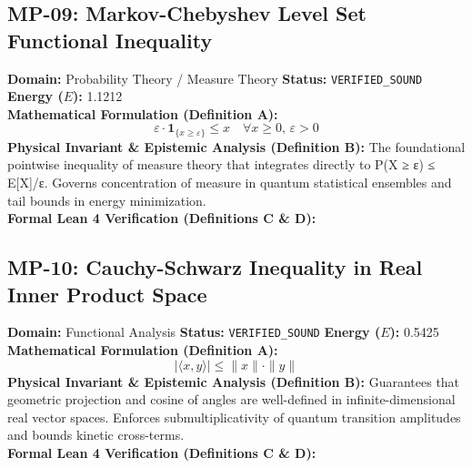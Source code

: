 \vspace{1em}
\subsection{MP-09: Markov-Chebyshev Level Set Functional Inequality}
\textbf{Domain:} Probability Theory / Measure Theory \hfill \textbf{Status:} \texttt{VERIFIED\_SOUND} \hfill \textbf{Energy ($E$):} 1.1212\\
\textbf{Mathematical Formulation (Definition A):}
\begin{equation*}
\varepsilon \cdot \mathbf{1}_{\{x \ge \varepsilon\}} \le x \quad \forall x \ge 0, \, \varepsilon > 0
\end{equation*}
\textbf{Physical Invariant \& Epistemic Analysis (Definition B):}
The foundational pointwise inequality of measure theory that integrates directly to P(X ≥ ε) ≤ E[X]/ε. Governs concentration of measure in quantum statistical ensembles and tail bounds in energy minimization.\\

\textbf{Formal Lean 4 Verification (Definitions C \& D):}


\vspace{1em}
\subsection{MP-10: Cauchy-Schwarz Inequality in Real Inner Product Space}
\textbf{Domain:} Functional Analysis \hfill \textbf{Status:} \texttt{VERIFIED\_SOUND} \hfill \textbf{Energy ($E$):} 0.5425\\
\textbf{Mathematical Formulation (Definition A):}
\begin{equation*}
|\langle x, y \rangle| \le \|x\| \cdot \|y\|
\end{equation*}
\textbf{Physical Invariant \& Epistemic Analysis (Definition B):}
Guarantees that geometric projection and cosine of angles are well-defined in infinite-dimensional real vector spaces. Enforces submultiplicativity of quantum transition amplitudes and bounds kinetic cross-terms.\\

\textbf{Formal Lean 4 Verification (Definitions C \& D):}


\vspace{1em}
